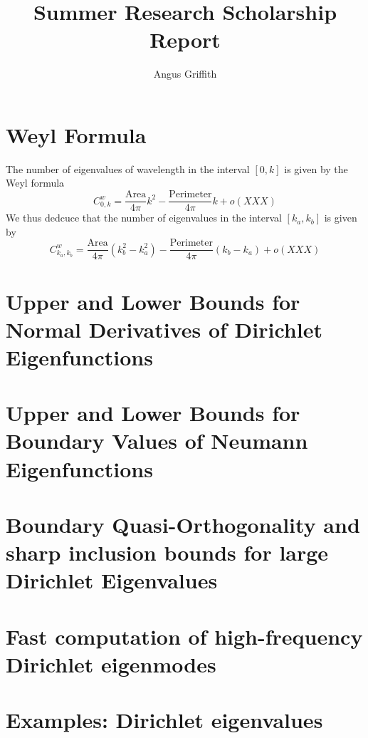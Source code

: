 \documentclass{article}
\author{Angus Griffith}
\title{Summer Research Scholarship Report}
\begin{document}
\section{Weyl Formula}
The number of eigenvalues of wavelength in the interval $[0,k]$ is given by the Weyl formula
\begin{equation}
C^w_{0,k} = \frac{\mbox{Area}}{4 \pi} k^2 - \frac{\mbox{Perimeter}}{4 \pi} k + o(XXX)
\end{equation}
We thus dedcuce that the number of eigenvalues in the interval $[k_a, k_b]$ is given by
\begin{equation}
\label{weyl}
C^w_{k_a,k_b} = \frac{\mbox{Area}}{4 \pi} (k_b^2 -k_a^2) - \frac{\mbox{Perimeter}}{4 \pi} (k_b - k_a) + o(XXX)
\end{equation}
\section{Upper and Lower Bounds for Normal Derivatives of Dirichlet Eigenfunctions}
\cite{HT02}

\section{Upper and Lower Bounds for Boundary Values of Neumann Eigenfunctions}
\cite{BHXX}

\section{Boundary Quasi-Orthogonality and sharp inclusion bounds for large Dirichlet Eigenvalues}
\cite{BH11}

\section{Fast computation of high-frequency Dirichlet eigenmodes}
\cite{BH14}

\section{Examples: Dirichlet eigenvalues}
\end{document}
